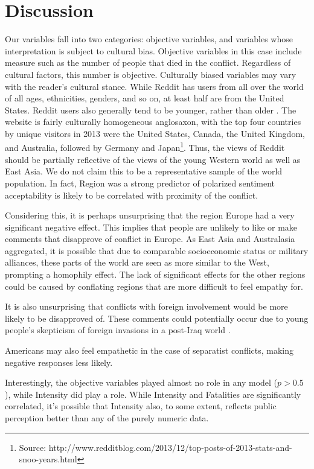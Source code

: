 \section{Discussion}
Our variables fall into two categories: objective variables, and variables whose interpretation is subject to cultural bias. Objective variables in this case include measure such as the number of people that died in the conflict. Regardless of cultural factors, this number is objective. Culturally biased variables may vary with the reader's cultural stance. While Reddit has users from all over the world of all ages, ethnicities, genders, and so on, at least half are from the United States\cite{reddit-demo}. Reddit users also generally tend to be younger, rather than older \cite{pewinternet}. The website is fairly culturally homogeneous anglosaxon, with the top four countries by unique visitors in 2013 were the United States, Canada, the United Kingdom, and Australia, followed by Germany and Japan\footnote{Source: http://www.redditblog.com/2013/12/top-posts-of-2013-stats-and-snoo-years.html}. Thus, the views of Reddit should be partially reflective of the views of the young Western world as well as East Asia.  We do not claim this to be a representative sample of the world population.  In fact, Region was a strong predictor of polarized sentiment acceptability is likely to be correlated with proximity of the conflict.

Considering this, it is perhaps unsurprising that the region Europe had a very significant negative effect. This implies that people are unlikely to like or make comments that disapprove of conflict in Europe. As East Asia and Australasia aggregated, it is possible that due to comparable socioeconomic status or military alliances, these parts of the world are seen as more similar to the West, prompting a homophily effect. The lack of significant effects for the other regions could be caused by conflating regions that are more difficult to feel empathy for.

It is also unsurprising that conflicts with foreign involvement would be more likely to be disapproved of. These comments could potentially occur due to young people's skepticism of foreign invasions in a post-Iraq world \cite{cato}. 

Americans may also feel empathetic in the case of separatist conflicts, making negative responses less likely.

Interestingly, the objective variables played almost no role in any model ($p > 0.5$), while Intensity did play a role. While Intensity and Fatalities are significantly correlated, it's possible that Intensity also, to some extent, reflects public perception better than any of the purely numeric data. 

